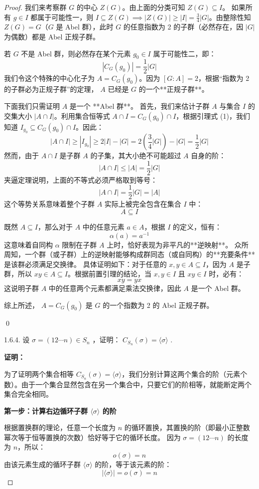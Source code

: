 \documentclass[]{article}
\begin{document}
\begin{proof}
我们来考察群 $G$ 的中心 $Z(G)$。由上面的分类可知 $Z(G) \subseteq I$。
如果所有 $g \in I$ 都属于可能性一，则 $I \subseteq Z(G) \implies |Z(G)| \ge |I| = \frac{3}{4}|G|$。由整除性知 $Z(G)=G$（$G$ 是 Abel 群），此时 $G$ 的任意指数为 2 的子群（必然存在，因 $|G|$ 为偶数）都是 Abel 正规子群。

若 $G$ 不是 Abel 群，则必然存在某个元素 $g_0 \in I$ 属于可能性二，即：
\[ |C_G(g_0)| = \frac{1}{2}|G| \]
我们令这个特殊的中心化子为 $A = C_G(g_0)$。因为 $[G : A] = 2$，根据“指数为 2 的子群必为正规子群”的定理， $A$ 已经是 $G$ 的一个**正规子群**。

下面我们只需证明 $A$ 是一个 **Abel 群**。
首先，我们来估计子群 $A$ 与集合 $I$ 的交集大小 $|A \cap I|$。利用集合恒等式 $A \cap I = C_G(g_0) \cap I$，根据引理式 (1)，我们知道 $I_{g_0} \subseteq C_G(g_0) \cap I$。因此：
\[ |A \cap I| \ge |I_{g_0}| \ge 2|I| - |G| = 2\left(\frac{3}{4}|G|\right) - |G| = \frac{1}{2}|G| \]
然而，由于 $A \cap I$ 是子群 $A$ 的子集，其大小绝不可能超过 $A$ 自身的阶：
\[ |A \cap I| \le |A| = \frac{1}{2}|G| \]
夹逼定理说明，上面的不等式必须严格取到等号：
\[ |A \cap I| = \frac{1}{2}|G| = |A| \]
这个等势关系意味着整个子群 $A$ 实际上被完全包含在集合 $I$ 中：
\[ A \subseteq I \]

既然 $A \subseteq I$，那么对于 $A$ 中的任意元素 $a \in A$，根据 $I$ 的定义，恒有：
\[ \alpha(a) = a^{-1} \]
这意味着自同构 $\alpha$ 限制在子群 $A$ 上时，恰好表现为非平凡的**逆映射**。
众所周知，一个群（或子群）上的逆映射能够构成群同态（或自同构）的**充要条件**是该群必须满足交换律。
具体证明如下：对于任意的 $x, y \in A \subseteq I$，因为 $A$ 是子群，所以 $xy \in A \subseteq I$。根据前置引理的结论，当 $x, y \in I$ 且 $xy \in I$ 时，必有：
\[ xy = yx \]
这说明子群 $A$ 中的任意两个元素都满足乘法交换律，因此 $A$ 是一个 Abel 群。

综上所述， $A = C_G(g_0)$ 是 $G$ 的一个指数为 2 的 Abel 正规子群。

\qed

1.6.4. 设 $\sigma=(12\cdots n)\in S_{n}$ ，证明： $C_{S_{n}}(\sigma)=\langle\sigma\rangle$ . 

\bigskip
\noindent \textbf{证明：} 

为了证明两个集合相等 $C_{S_{n}}(\sigma) = \langle\sigma\rangle$，我们分别计算这两个集合的阶（元素个数）。由于一个集合显然包含在另一个集合中，只要它们的阶相等，就能断定两个集合完全相同。

\bigskip
\noindent \textbf{第一步：计算右边循环子群 $\langle\sigma\rangle$ 的阶}

根据置换群的理论，任意一个长度为 $n$ 的循环置换，其置换的阶（即最小正整数幂次等于恒等置换的次数）恰好等于它的循环长度。
因为 $\sigma = (12\cdots n)$ 的长度为 $n$，所以：
\[ o(\sigma) = n \]
由该元素生成的循环子群 $\langle\sigma\rangle$ 的阶，等于该元素的阶：
\[ |\langle\sigma\rangle| = o(\sigma) = n \]


\end{proof}
\end{document}
